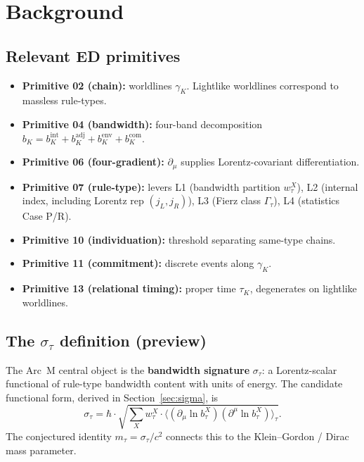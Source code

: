 \documentclass[11pt,a4paper]{article}
\begin{document}
\section{Background}

\subsection{Relevant ED primitives}

\begin{itemize}
  \item \textbf{Primitive 02 (chain):} worldlines $\gamma_K$. Lightlike worldlines correspond to massless rule-types.
  \item \textbf{Primitive 04 (bandwidth):} four-band decomposition $b_K = b_K^{\mathrm{int}} + b_K^{\mathrm{adj}} + b_K^{\mathrm{env}} + b_K^{\mathrm{com}}$.
  \item \textbf{Primitive 06 (four-gradient):} $\partial_\mu$ supplies Lorentz-covariant differentiation.
  \item \textbf{Primitive 07 (rule-type):} levers L1 (bandwidth partition $w_\tau^X$), L2 (internal index, including Lorentz rep $(j_L, j_R)$), L3 (Fierz class $\Gamma_\tau$), L4 (statistics Case P/R).
  \item \textbf{Primitive 10 (individuation):} threshold separating same-type chains.
  \item \textbf{Primitive 11 (commitment):} discrete events along $\gamma_K$.
  \item \textbf{Primitive 13 (relational timing):} proper time $\tau_K$, degenerates on lightlike worldlines.
\end{itemize}

\subsection{The $\sigma_\tau$ definition (preview)}

The Arc~M central object is the \textbf{bandwidth signature} $\sigma_\tau$: a Lorentz-scalar functional of rule-type bandwidth content with units of energy. The candidate functional form, derived in Section~\ref{sec:sigma}, is
\begin{equation}
\sigma_\tau = \hbar \cdot \sqrt{\sum_X w_\tau^X \cdot \langle (\partial_\mu \ln b_\tau^X)(\partial^\mu \ln b_\tau^X) \rangle_\tau}.
\end{equation}
The conjectured identity $m_\tau = \sigma_\tau/c^2$ connects this to the Klein--Gordon / Dirac mass parameter.
\end{document}
